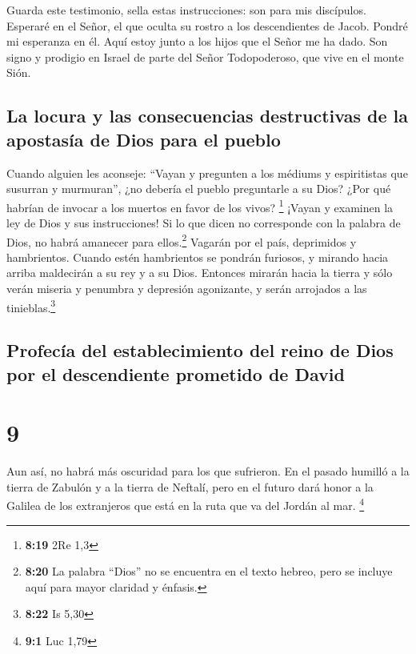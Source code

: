  Guarda este testimonio, sella estas instrucciones: son
para mis discípulos.  Esperaré en el Señor, el que oculta
su rostro a los descendientes de Jacob. Pondré mi esperanza en él.
 Aquí estoy junto a los hijos que el Señor me ha dado.
Son signo y prodigio en Israel de parte del Señor Todopoderoso, que vive
en el monte Sión.

\hypertarget{la-locura-y-las-consecuencias-destructivas-de-la-apostasuxeda-de-dios-para-el-pueblo}{%
\subsection{La locura y las consecuencias destructivas de la apostasía
de Dios para el
pueblo}\label{la-locura-y-las-consecuencias-destructivas-de-la-apostasuxeda-de-dios-para-el-pueblo}}

 Cuando alguien les aconseje: ``Vayan y pregunten a los
médiums y espiritistas que susurran y murmuran'', ¿no debería el pueblo
preguntarle a su Dios? ¿Por qué habrían de invocar a los muertos en
favor de los vivos? \footnote{\textbf{8:19} 2Re 1,3} 
¡Vayan y examinen la ley de Dios y sus instrucciones! Si lo que dicen no
corresponde con la palabra de Dios, no habrá amanecer para
ellos.\footnote{\textbf{8:20} La palabra ``Dios'' no se encuentra en el
  texto hebreo, pero se incluye aquí para mayor claridad y énfasis.}
 Vagarán por el país, deprimidos y hambrientos. Cuando
estén hambrientos se pondrán furiosos, y mirando hacia arriba maldecirán
a su rey y a su Dios.  Entonces mirarán hacia la tierra y
sólo verán miseria y penumbra y depresión agonizante, y serán arrojados
a las tinieblas.\footnote{\textbf{8:22} Is 5,30}

\hypertarget{profecuxeda-del-establecimiento-del-reino-de-dios-por-el-descendiente-prometido-de-david}{%
\subsection{Profecía del establecimiento del reino de Dios por el
descendiente prometido de
David}\label{profecuxeda-del-establecimiento-del-reino-de-dios-por-el-descendiente-prometido-de-david}}

\hypertarget{section-8}{%
\section{9}\label{section-8}}

 Aun así, no habrá más oscuridad para los que sufrieron.
En el pasado humilló a la tierra de Zabulón y a la tierra de Neftalí,
pero en el futuro dará honor a la Galilea de los extranjeros que está en
la ruta que va del Jordán al mar. \footnote{\textbf{9:1} Luc 1,79}

